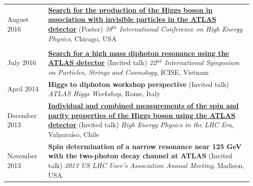 \documentclass{letter}
\begin{document}
\begin{tabular}{p{}p{}}
	August 2016
	&
	\href{https://cds.cern.ch/record/2208271}{\textbf{Search for the production of the Higgs boson in association with invisible particles in the ATLAS detector}} (Poster) \newline 
	\textit{38$^{th}$ International Conference on High Energy Physics}, Chicago, USA \\
\\
	July 2016
	&
	\href{https://cds.cern.ch/record/2199807}{\textbf{Search for a high mass diphoton resonance using the ATLAS detector}} (Invited talk) \newline 
	\textit{22$^{nd}$ International Symposium on Particles, Strings and Cosmology}, ICISE, Vietnam \newline
\\
	April 2014
	&
	\textbf{Higgs to diphoton workshop perspective} (Invited talk) \newline
	\textit{ATLAS Higgs Workshop}, Rome, Italy \newline
\\
	December 2013
	&
	\href{https://cds.cern.ch/record/1640386}{\textbf{Individual and combined measurements of the spin and parity properties of the Higgs boson using the ATLAS detector}} (Invited talk) \newline
	\textit{High Energy Physics in the LHC Era}, Valpara\'{i}so, Chile \newline
\\
	November 2013
	&
	\textbf{Spin determination of a narrow resonance near 125 GeV with the two-photon decay channel at ATLAS} (Invited talk) \newline
	\textit{2013 US LHC User's Association Annual Meeting}, Madison, USA \newline

\end{tabular}
\end{document}
